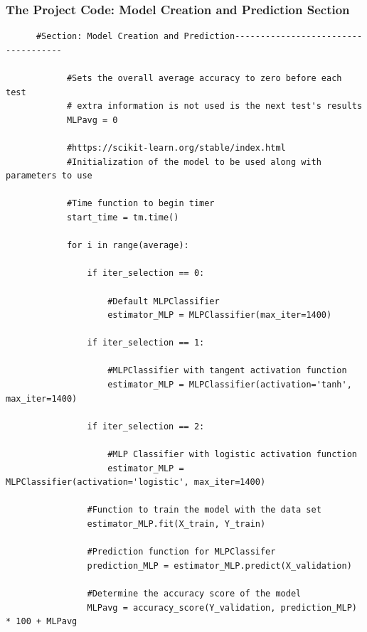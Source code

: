 \documentclass{beamer}
\begin{document}
\begin{frame}[fragile]
\frametitle{The Project Code: Model Creation and Prediction Section}

\fontsize{6}{5}
\begin{verbatim}
      #Section: Model Creation and Prediction------------------------------------

            #Sets the overall average accuracy to zero before each test
            # extra information is not used is the next test's results
            MLPavg = 0

            #https://scikit-learn.org/stable/index.html
            #Initialization of the model to be used along with parameters to use

            #Time function to begin timer
            start_time = tm.time()

            for i in range(average):

                if iter_selection == 0:

                    #Default MLPClassifier
                    estimator_MLP = MLPClassifier(max_iter=1400)

                if iter_selection == 1:

                    #MLPClassifier with tangent activation function
                    estimator_MLP = MLPClassifier(activation='tanh', max_iter=1400)

                if iter_selection == 2:

                    #MLP Classifier with logistic activation function
                    estimator_MLP = MLPClassifier(activation='logistic', max_iter=1400)

                #Function to train the model with the data set
                estimator_MLP.fit(X_train, Y_train)

                #Prediction function for MLPClassifer
                prediction_MLP = estimator_MLP.predict(X_validation)
               
                #Determine the accuracy score of the model
                MLPavg = accuracy_score(Y_validation, prediction_MLP) * 100 + MLPavg

\end{verbatim}
\end{frame}

\end{document}
